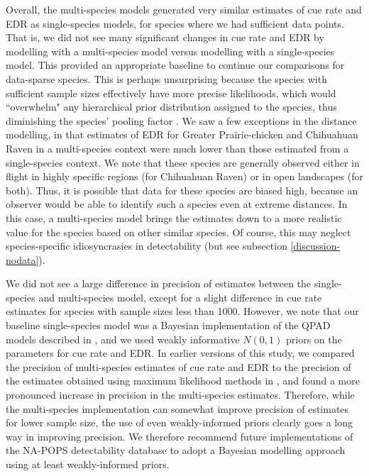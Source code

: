\documentclass[12pt]{article}
\begin{document}
\par Overall, the multi-species models generated very similar estimates of cue rate and EDR as single-species models, for species where we had sufficient data points.
That is, we did not see many significant changes in cue rate and EDR by modelling with a multi-species model versus modelling with a single-species model.
This provided an appropriate baseline to continue our comparisons for data-sparse species.
This is perhaps unsurprising because the species with sufficient sample sizes effectively have more precise likelihoods, which would ``overwhelm" any hierarchical prior distribution assigned to the species, thus diminishing the species' pooling factor \citep{gelman_bayesian_2006}.
We saw a few exceptions in the distance modelling, in that estimates of EDR for Greater Prairie-chicken and Chihuahuan Raven in a multi-species context were much lower than those estimated from a single-species context.
We note that these species are generally observed either in flight in highly specific regions (for Chihuahuan Raven) or in open landscapes (for both).
Thus, it is possible that data for these species are biased high, because an observer would be able to identify such a species even at extreme distances.
In this case, a multi-species model brings the estimates down to a more realistic value for the species based on other similar species.
Of course, this may neglect species-specific idiosyncrasies in detectability (but see subsection \ref{discussion-nodata}).

\par We did not see a large difference in precision of estimates between the single-species and multi-species model, except for a slight difference in cue rate estimates for species with sample sizes less than 1000.
However, we note that our baseline single-species model was a Bayesian implementation of the QPAD models described in \citet{solymos_calibrating_2013}, and we used weakly informative $N(0,1)$ priors on the parameters for cue rate and EDR.
In earlier versions of this study, we compared the precision of multi-species estimates of cue rate and EDR to the precision of the estimates obtained using maximum likelihood methods in \citet{edwards_point_2023}, and found a more pronounced increase in precision in the multi-species estimates.
Therefore, while the multi-species implementation can somewhat improve precision of estimates for lower sample size, the use of even weakly-informed priors clearly goes a long way in improving precision.
We therefore recommend future implementations of the NA-POPS detectability database to adopt a Bayesian modelling approach using at least weakly-informed priors.
\end{document}
